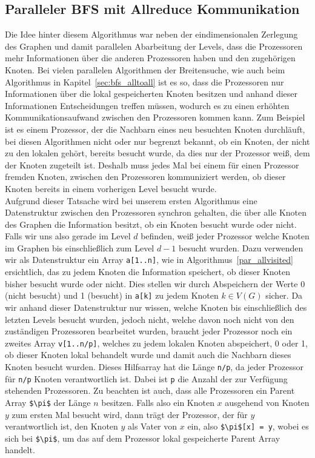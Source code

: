 \documentclass[11pt,a4paper]{article}
\begin{document}
\subsection{Paralleler BFS mit Allreduce Kommunikation}
\label{sec:bfs_allreduce}
Die Idee hinter diesem Algorithmus war neben der eindimensionalen Zerlegung des Graphen und damit parallelen Abarbeitung der Levels, dass die Prozessoren mehr Informationen über die anderen Prozessoren haben und den zugehörigen Knoten. Bei vielen parallelen Algorithmen der Breitensuche, wie auch beim Algorithmus in Kapitel~\ref{sec:bfs_alltoall} ist es so, dass die Prozessoren nur Informationen über die lokal gespeicherten Knoten besitzen und anhand dieser Informationen Entscheidungen treffen müssen, wodurch es zu einen erhöhten Kommunikationsaufwand zwischen den Prozessoren kommen kann. Zum Beispiel ist es einem Prozessor, der die Nachbarn eines neu besuchten Knoten durchläuft, bei diesen Algorithmen nicht oder nur begrenzt bekannt, ob ein Knoten, der nicht zu den lokalen gehört, bereits besucht wurde, da dies nur der Prozessor weiß, dem der Knoten zugeteilt ist. Deshalb muss jedes Mal bei einem für einen Prozessor fremden Knoten, zwischen den Prozessoren kommuniziert werden, ob dieser Knoten bereits in einem vorherigen Level besucht wurde.\\
Aufgrund dieser Tatsache wird bei unserem ersten Algorithmus eine Datenstruktur zwischen den Prozessoren synchron gehalten, die über alle Knoten des Graphen die Information besitzt, ob ein Knoten besucht wurde oder nicht. Falls wir uns also gerade im Level \(d\) befinden, weiß jeder Prozessor welche Knoten im Graphen bis einschließlich zum Level \(d-1\) besucht wurden. Dazu verwenden wir als Datenstruktur ein Array \lstinline{a[1..n]}, wie in Algorithmus~\ref{par_allvisited} ersichtlich, das zu jedem Knoten die Information speichert, ob dieser Knoten bisher besucht wurde oder nicht. Dies stellen wir durch Abspeichern der Werte 0 (nicht besucht) und 1 (besucht) in \lstinline{a[k]} zu jedem Knoten \(k \in V(G)\) sicher. Da wir anhand dieser Datenstruktur nur wissen, welche Knoten bis einschließlich des letzten Levels besucht wurden, jedoch nicht, welche davon noch nicht von den zuständigen Prozessoren bearbeitet wurden, braucht jeder Prozessor noch ein zweites Array \lstinline{v[1..n/p]}, welches zu jedem lokalen Knoten abspeichert, 0 oder 1, ob dieser Knoten lokal behandelt wurde und damit auch die Nachbarn dieses Knoten besucht wurden. Dieses Hilfsarray hat die Länge \lstinline{n/p}, da jeder Prozessor für \lstinline{n/p} Knoten verantwortlich ist. Dabei ist \lstinline{p} die Anzahl der zur Verfügung stehenden Prozessoren. Zu beachten ist auch, dass alle Prozessoren ein Parent Array \lstinline{$\pi$} der Länge \(n\) besitzen. Falls also ein Knoten \(x\) ausgehend von Knoten \(y\) zum ersten Mal besucht wird, dann trägt der Prozessor, der für \(y\) verantwortlich ist, den Knoten \(y\) als Vater von \(x\) ein, also \lstinline{$\pi$[x] = y}, wobei es sich bei \lstinline{$\pi$}, um das auf dem Prozessor lokal gespeicherte Parent Array handelt.
\end{document}

